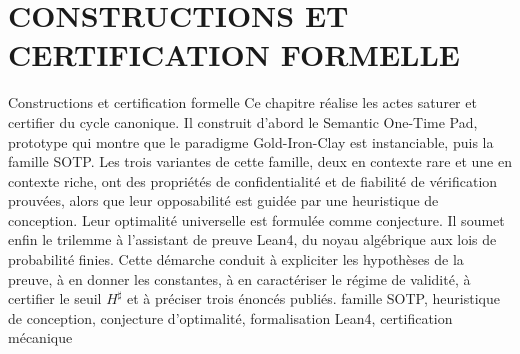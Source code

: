 \documentclass[a4paper,11pt,reqno,oneside]{memoir}
\begin{document}
\chapter[CONSTRUCTIONS ET CERTIFICATION FORMELLE]%
        {CONSTRUCTIONS ET CERTIFICATION FORMELLE}
\label{chap:constructions}
\debutChapitre%
  {Constructions et certification formelle}%
  {%
    Ce chapitre r\'ealise les actes saturer et certifier du cycle
    canonique. Il construit d'abord le Semantic One-Time Pad, prototype qui
    montre que le paradigme Gold-Iron-Clay est instanciable, puis la famille
    SOTP. Les trois variantes de cette famille, deux en contexte rare et une en contexte riche,
    ont des propri\'et\'es de confidentialit\'e et de fiabilit\'e de v\'erification
    prouv\'ees, alors que leur opposabilit\'e est guid\'ee par une heuristique de conception.
    Leur optimalit\'e universelle est formul\'ee comme conjecture. Il soumet enfin le
    trilemme \`a l'assistant de preuve Lean4, du noyau alg\'ebrique aux lois de probabilit\'e
    finies. Cette d\'emarche conduit \`a expliciter les hypoth\`eses de la preuve, \`a en donner
    les constantes, \`a en caract\'eriser le r\'egime de validit\'e, \`a certifier le seuil
    $H^\sharp$ et \`a pr\'eciser trois \'enonc\'es publi\'es.%
  }%
  {%
    famille SOTP, heuristique de conception, conjecture d'optimalit\'e,
    formalisation Lean4, certification m\'ecanique%
  }%







\end{document}
